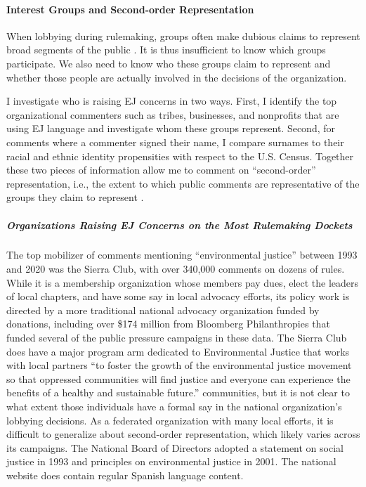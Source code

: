 \documentclass[
      12pt,
        ]{article}
\begin{document}
\hypertarget{interest-groups-and-second-order-representation}{%
\paragraph{Interest Groups and Second-order Representation}\label{interest-groups-and-second-order-representation}}

When lobbying during rulemaking, groups often
make dubious claims to represent broad segments of the public \citep{Seifter2016UCLA}. It is thus insufficient to know which groups participate. We
also need to know who these groups claim to represent and whether those people are actually involved in the decisions of the organization.

I investigate who is raising EJ concerns in two ways.
First, I identify the top organizational commenters such as tribes,
businesses, and nonprofits that are using EJ language
and investigate whom these groups represent. Second, for comments where a
commenter signed their name, I compare surnames to their racial and ethnic
identity propensities with respect to the U.S. Census. Together these
two pieces of information allow me to comment on ``second-order'' representation, i.e., the extent to which public comments are
representative of the groups they claim to represent \citep{Seifter2016UCLA}.

\hypertarget{organizations-raising-ej-concerns-on-the-most-rulemaking-dockets}{%
\subparagraph{Organizations Raising EJ Concerns on the Most Rulemaking Dockets}\label{organizations-raising-ej-concerns-on-the-most-rulemaking-dockets}}

The top mobilizer of comments mentioning ``environmental justice'' between 1993 and 2020 was the Sierra Club, with over 340,000 comments on dozens of rules. While it is a membership organization whose members pay dues, elect the leaders of local chapters, and have some say in local advocacy efforts, its policy work is directed by a more traditional national advocacy organization funded by donations, including over \$174 million from Bloomberg Philanthropies that funded several of the public pressure campaigns in these data. The Sierra Club does have a major program arm dedicated to Environmental Justice that works with local partners ``to foster the growth of the environmental justice movement so that oppressed communities will find justice and everyone can experience the benefits of a healthy and sustainable future.'' communities, but it is not clear to what extent those individuals have a formal say in the national organization's lobbying decisions. As a federated organization with many local efforts, it is difficult to generalize about second-order representation, which likely varies across its campaigns. The National Board of Directors adopted a statement on social justice in 1993 and principles on environmental justice in 2001. The national website does contain regular Spanish language content.
\end{document}
